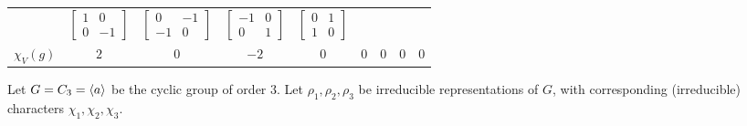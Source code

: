 \begin{example}
\begin{table}[H]
\begin{tabular}{|c|cccccccc|}
            &
            $\begin{bmatrix} 1 & 0 \\ 0 & -1 \end{bmatrix}$
            &
            $\begin{bmatrix} 0 & -1 \\ -1 & 0 \end{bmatrix}$
            &
            $\begin{bmatrix} -1 & 0 \\ 0 & 1 \end{bmatrix}$
            &
            $\begin{bmatrix} 0 & 1 \\ 1 & 0 \end{bmatrix}$
            \\
            $\chi_V(g)$ & $2$ & $0$ & $-2$ & $0$ & $0$ & $0$ & $0$ & $0$ \\
            \hline
        \end{tabular}
    \end{table}
\end{example}

Let $G = C_3 = \left\langle a \right\rangle$ be the cyclic group of order $3$. Let $\rho_1, \rho_2, \rho_3$ be irreducible representations of $G$, with corresponding (irreducible) characters $\chi_1, \chi_2, \chi_3$.
